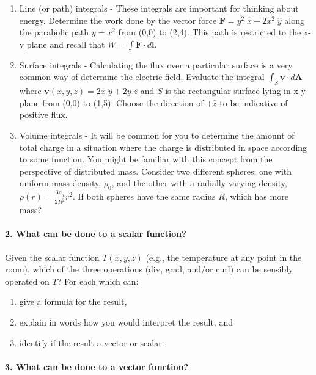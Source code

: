 \documentclass[11pt]{article}
\def\tightlist{}
\begin{document}
\begin{enumerate}
\def\labelenumi{\arabic{enumi}.}
\tightlist
\item
  Line (or path) integrals - These integrals are important for thinking
  about energy. Determine the work done by the vector force
  \(\mathbf{F} = y^2\;\hat{x} - 2x^2\;\hat{y}\) along the parabolic path
  \(y=x^2\) from (0,0) to (2,4). This path is restricted to the x-y
  plane and recall that \(W=\int \mathbf{F}\cdot d\mathbf{l}\).
\item
  Surface integrals - Calculating the flux over a particular surface is
  a very common way of determine the electric field. Evaluate the
  integral \(\int_S \mathbf{v}\cdot d\mathbf{A}\) where
  \(\mathbf{v}(x,y,z) = 2x\;\hat{y} + 2y\;\hat{z}\) and \(S\) is the
  rectangular surface lying in x-y plane from (0,0) to (1,5). Choose the
  direction of \(+\hat{z}\) to be indicative of positive flux.
\item
  Volume integrals - It will be common for you to determine the amount
  of total charge in a situation where the charge is distributed in
  space according to some function. You might be familiar with this
  concept from the perspective of distributed mass. Consider two
  different spheres: one with uniform mass density, \(\rho_0\), and the
  other with a radially varying density,
  \(\rho(r)=\frac{3\rho_0}{2R^2}r^2\). If both spheres have the same
  radius \(R\), which has more mass?
\end{enumerate}

\paragraph{2. What can be done to a scalar
function?}\label{what-can-be-done-to-a-scalar-function}

Given the scalar function \(T(x,y,z)\) (e.g., the temperature at any
point in the room), which of the three operations (div, grad, and/or
curl) can be sensibly operated on \(T\)? For each which can:

\begin{enumerate}
\def\labelenumi{\arabic{enumi}.}
\tightlist
\item
  give a formula for the result,
\item
  explain in words how you would interpret the result, and
\item
  identify if the result a vector or scalar.
\end{enumerate}

\paragraph{3. What can be done to a vector
function?}\label{what-can-be-done-to-a-vector-function}
\end{document}
